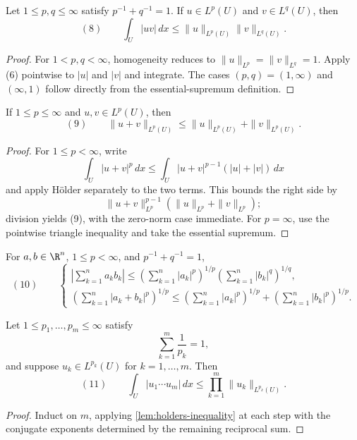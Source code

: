 \begin{lemma}
\label{lem:holders-inequality}
Let $1\leq p,q\leq\infty$ satisfy $p^{-1}+q^{-1}=1$. If $u\in L^p(U)$ and $v\in L^q(U)$, then
\[
(8)\qquad
\int_U|uv|\,dx
\leq\|u\|_{L^p(U)}\|v\|_{L^q(U)}.
\]
\end{lemma}
\begin{proof}
\sketch For $1<p,q<\infty$, homogeneity reduces to $\|u\|_{L^p}=\|v\|_{L^q}=1$. Apply (6) pointwise to $|u|$ and $|v|$ and integrate. The cases $(p,q)=(1,\infty)$ and $(\infty,1)$ follow directly from the essential-supremum definition.
\end{proof}

\begin{lemma}
\label{lem:minkowskis-inequality}
If $1\leq p\leq\infty$ and $u,v\in L^p(U)$, then
\[
(9)\qquad
\|u+v\|_{L^p(U)}
\leq\|u\|_{L^p(U)}+\|v\|_{L^p(U)}.
\]
\end{lemma}
\begin{proof}
\sketch For $1\leq p<\infty$, write
\[
\int_U|u+v|^p\,dx
\leq\int_U|u+v|^{p-1}(|u|+|v|)\,dx
\]
and apply H\"older separately to the two terms. This bounds the right side by
\[
\|u+v\|_{L^p}^{p-1}
(\|u\|_{L^p}+\|v\|_{L^p});
\]
division yields (9), with the zero-norm case immediate. For $p=\infty$, use the pointwise triangle inequality and take the essential supremum.
\end{proof}

\begin{remark}
\label{rem:discrete-holder-minkowski-inequalities}
For $a,b\in\R^n$, $1\leq p<\infty$, and $p^{-1}+q^{-1}=1$,
\[
(10)\qquad
\begin{cases}
\displaystyle
\left|\sum_{k=1}^na_kb_k\right|
\leq
\left(\sum_{k=1}^n|a_k|^p\right)^{1/p}
\left(\sum_{k=1}^n|b_k|^q\right)^{1/q},\\[1em]
\displaystyle
\left(\sum_{k=1}^n|a_k+b_k|^p\right)^{1/p}
\leq
\left(\sum_{k=1}^n|a_k|^p\right)^{1/p}
+\left(\sum_{k=1}^n|b_k|^p\right)^{1/p}.
\end{cases}
\]
\end{remark}

\begin{lemma}
\label{lem:general-holder-inequality}
Let $1\leq p_1,\ldots,p_m\leq\infty$ satisfy
\[
\sum_{k=1}^m\frac1{p_k}=1,
\]
and suppose $u_k\in L^{p_k}(U)$ for $k=1,\ldots,m$. Then
\[
(11)\qquad
\int_U|u_1\cdots u_m|\,dx
\leq\prod_{k=1}^m\|u_k\|_{L^{p_k}(U)}.
\]
\end{lemma}
\begin{proof}
\sketch Induct on $m$, applying \cref{lem:holders-inequality} at each step with the conjugate exponents determined by the remaining reciprocal sum.
\end{proof}

